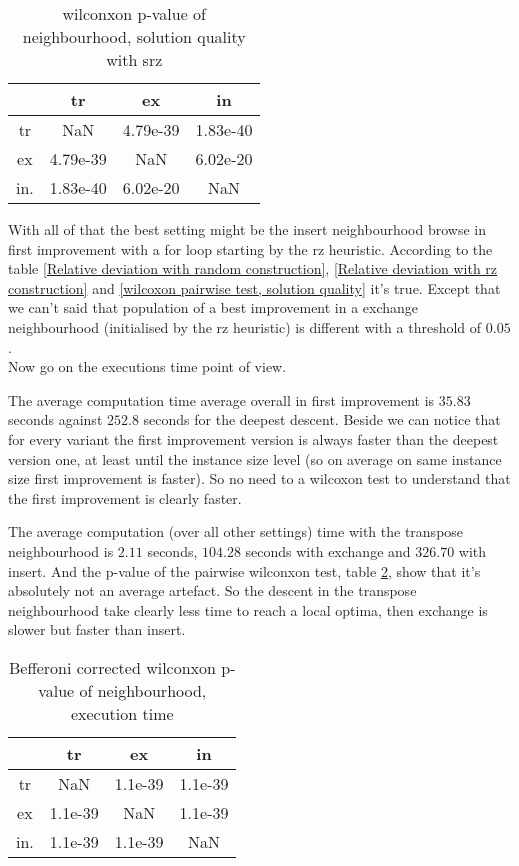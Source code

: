 \documentclass[12pt,a4paper]{article}
\begin{document}
\begin{table}[!h]
\centering
\begin{tabular}{|*{4}{c|}}
  \hline
   & tr & ex & in\\
  \hline
tr & NaN & 4.79e-39 & 1.83e-40 \\
ex & 4.79e-39 & NaN & 6.02e-20 \\
in. & 1.83e-40 & 6.02e-20 & NaN \\
  \hline
\end{tabular}
\caption{wilconxon p-value of neighbourhood, solution quality with srz}
\label{wilconxon p-value of neighbourhood, solution quality with srz}
\end{table}

With all of that the best setting might be the insert neighbourhood browse in first improvement with a for loop starting by the rz heuristic. According to the table \ref{Relative deviation with random construction}, \ref{Relative deviation with rz construction} and \ref{wilcoxon pairwise test, solution quality} it's true. Except that we can't said that population of a best improvement in a exchange neighbourhood (initialised by the rz heuristic) is different with a threshold of $0.05$.\\

Now go on the executions time point of view.

The average computation time average overall in first improvement is $35.83$ seconds against $252.8$ seconds for the deepest descent. Beside we can notice that for every variant the first improvement version is always faster than the deepest version one, at least until the instance size level (so on average on same instance size first improvement is faster). So no need to a wilcoxon test to understand that the first improvement is clearly faster.

The average computation (over all other settings) time with the transpose neighbourhood is $2.11$ seconds, $104.28$ seconds with exchange and $326.70$ with insert. And the p-value of the pairwise wilconxon test, table \ref{Befferoni corrected wilconxon p-value of neighbourhood time}, show that it's absolutely not an average artefact. So the descent in the transpose neighbourhood take clearly less time to reach a local optima, then exchange is slower but faster than insert.
\begin{table}[!h]
\centering
\begin{tabular}{|*{4}{c|}}
  \hline
   & tr & ex & in\\
  \hline
	tr & NaN & 1.1e-39 & 1.1e-39 \\
	ex & 1.1e-39 & NaN & 1.1e-39 \\
	in. & 1.1e-39 & 1.1e-39 & NaN \\
  \hline
\end{tabular}
\caption{Befferoni corrected wilconxon p-value of neighbourhood, execution time}
\label{Befferoni corrected wilconxon p-value of neighbourhood time}
\end{table}
\end{document}

